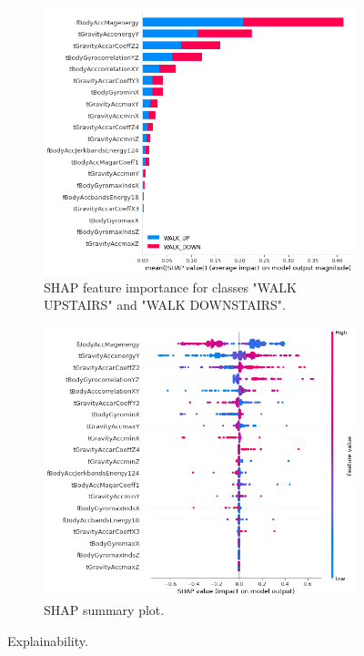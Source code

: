 \documentclass[10pt, a4paper, twocolumn]{article}
\begin{document}
\begin{figure}[t]
\centering
    \begin{subfigure}{0.92\columnwidth}
        \includegraphics[width=\linewidth]{immagini Lia/shap bar.png}
        \caption{SHAP feature importance for classes "WALK UPSTAIRS" and "WALK DOWNSTAIRS".}
        \label{fig:shapbar}
    \end{subfigure}
    \begin{subfigure}{0.92\columnwidth}
        \includegraphics[width=\linewidth]{immagini Lia/shap strano.png}
        \caption{SHAP summary plot.}
        \label{fig:shappoint}
    \end{subfigure}
\caption{Explainability.}
\label{fig:explainability}
\end{figure}
\end{document}

